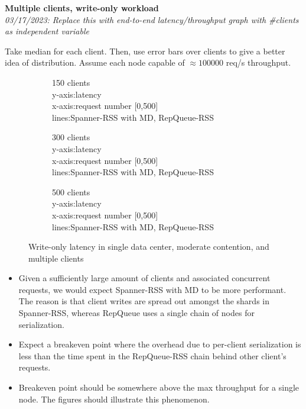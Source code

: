 \documentclass[letterpaper, 11pt]{article}
\begin{document}
\noindent\textbf{Multiple clients, write-only workload} \\
\textit{03/17/2023: Replace this with end-to-end latency/throughput graph with \#clients as independent variable}
\par Take median for each client. Then, use error bars over clients to give a better idea of distribution. Assume each node capable of $\approx 100000$ req/s throughput. 
\begin{figure}[H]
  \centering
  \begin{subfigure}[t]{0.3\textwidth}
    \begin{tcolorbox}[width=\textwidth, sharp corners=all, frame empty]
      150 clients \\
    y-axis:latency\\
    x-axis:request number [0,500] \\
    lines:Spanner-RSS with MD, RepQueue-RSS
  \end{tcolorbox}
\end{subfigure}
\begin{subfigure}[t]{0.3\textwidth}
  \begin{tcolorbox}[width=\textwidth, sharp corners=all, frame empty]
    300 clients\\
    y-axis:latency\\
    x-axis:request number [0,500] \\
    lines:Spanner-RSS with MD, RepQueue-RSS
  \end{tcolorbox}
\end{subfigure}
\begin{subfigure}[t]{0.3\textwidth}
  \begin{tcolorbox}[width=\textwidth, sharp corners=all, frame empty]
    500 clients\\
    y-axis:latency\\
    x-axis:request number [0,500] \\
    lines:Spanner-RSS with MD, RepQueue-RSS
  \end{tcolorbox}
\end{subfigure}
\caption{Write-only latency in single data center, moderate contention, and multiple clients}
\end{figure}
\begin{itemize}
\item Given a sufficiently large amount of clients and associated concurrent requests, we would expect Spanner-RSS with MD to be more performant. The reason is that client writes are spread out amongst the shards in Spanner-RSS, whereas RepQueue uses a single chain of nodes for serialization.
\item Expect a breakeven point where the overhead due to per-client serialization is less than the time spent in the RepQueue-RSS chain behind other client's requests.
\item Breakeven point should be somewhere above the max throughput for a single node. The figures should illustrate this phenomenon.
\end{itemize}
\end{document}
